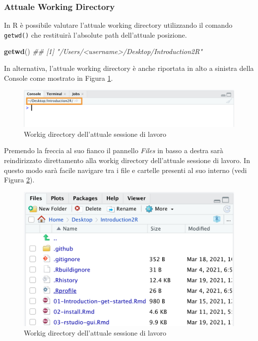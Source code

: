 \documentclass[
]{book}
\newenvironment{Shaded}{\begin{snugshade}}{\end{snugshade}}
\newcommand{\CommentTok}[1]{\textcolor[rgb]{0.56,0.35,0.01}{\textit{#1}}}
\newcommand{\KeywordTok}[1]{\textcolor[rgb]{0.13,0.29,0.53}{\textbf{#1}}}
\newcommand{\NormalTok}[1]{#1}
\begin{document}
\hypertarget{attuale-working-directory}{%
\subsubsection*{Attuale Working Directory}\label{attuale-working-directory}}

In R è possibile valutare l'attuale working directory utilizzando il comando \texttt{getwd()} che restituirà l'absolute path dell'attuale posizione.

\begin{Shaded}
\begin{Highlighting}[]
\KeywordTok{getwd}\NormalTok{()}
\CommentTok{## [1] "/Users/<username>/Desktop/Introduction2R"}
\end{Highlighting}
\end{Shaded}

In alternativa, l'attuale working directory è anche riportata in alto a sinistra della Console come mostrato in Figura \ref{fig:current-wd}.

\begin{figure}

{\centering \includegraphics[width=0.95\linewidth]{images/current-wd} 

}

\caption{Workig directory dell'attuale sessione di lavoro}\label{fig:current-wd}
\end{figure}

Premendo la freccia al suo fianco il pannello \emph{Files} in basso a destra sarà reindirizzato direttamento alla workig directory dell'attuale sessione di lavoro. In questo modo sarà facile navigare tra i file e cartelle presenti al suo interno (vedi Figura \ref{fig:current-folder}).

\begin{figure}

{\centering \includegraphics[width=0.65\linewidth]{images/current-folder} 

}

\caption{Workig directory dell'attuale sessione di lavoro}\label{fig:current-folder}
\end{figure}
\end{document}
